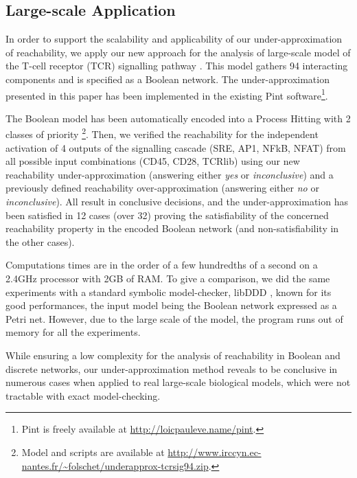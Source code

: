 \subsection{Large-scale Application}

In order to support the scalability and applicability of our under-approximation of reachability, we
apply our new approach for the analysis of large-scale model of the T-cell receptor (TCR)
signalling pathway \cite{tcrsig94}.
This model gathers 94 interacting components and is specified as a Boolean network.
The under-approximation presented in this paper has been implemented in the existing Pint
software\footnote{Pint is freely available at \url{http://loicpauleve.name/pint}.}.

The Boolean model has been automatically encoded into a Process Hitting with 2 classes of priority%
\footnote{Model and scripts are available at
\url{http://www.irccyn.ec-nantes.fr/~folschet/underapprox-tcrsig94.zip}.}.
Then, we verified the reachability for the independent activation of 4 outputs of the signalling
cascade (SRE, AP1, NFkB, NFAT) from all possible input combinations (CD45, CD28, TCRlib) using our
new reachability under-approximation (answering either \emph{yes} or \emph{inconclusive}) and a 
previously defined reachability over-approximation \cite{PMR12-MSCS} (answering either \emph{no} or
\emph{inconclusive}).
All result in conclusive decisions, and the under-approximation has been satisfied in 12 cases (over
32) proving the satisfiability of the concerned reachability property in the encoded Boolean network
(and non-satisfiability in the other cases).

Computations times are in the order of a few hundredths of a second on a 2.4GHz processor with 2GB
of RAM.
To give a comparison, we did the same experiments with a standard symbolic model-checker, libDDD
\cite{libddd}, known for its good performances, the input model being the Boolean network expressed
as a Petri net.
However, due to the large scale of the model, the program runs out of memory for all the experiments.

While ensuring a low complexity for the analysis of reachability in Boolean and discrete networks, our
under-approximation method reveals to be conclusive in numerous cases when applied to real
large-scale biological models, which were not tractable with exact model-checking.

